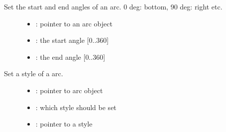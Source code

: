 \documentclass[letterpaper,10pt,english]{sphinxmanual}
\begin{document}
\begin{fulllineitems}
\label{\detokenize{object-types/arc:_CPPv417lv_arc_set_anglesP8lv_obj_t8uint16_t8uint16_t}}%
\pysigstartmultiline
{}\label{\detokenize{object-types/arc:lv__arc_8h_1adeefed29c45e9fc124ccad352a1e663a}}%
\pysigstopmultiline
Set the start and end angles of an arc. 0 deg: bottom, 90 deg: right etc. \begin{description}
\item[{}] \leavevmode\begin{itemize}
\item {} 
: pointer to an arc object 

\item {} 
: the start angle {[}0..360{]} 

\item {} 
: the end angle {[}0..360{]} 

\end{itemize}

\end{description}


\end{fulllineitems}


\begin{fulllineitems}
\label{\detokenize{object-types/arc:_CPPv416lv_arc_set_styleP8lv_obj_t14lv_arc_style_tPK10lv_style_t}}%
\pysigstartmultiline
{}\label{\detokenize{object-types/arc:lv__arc_8h_1af7148d3fea5bc35d300d838a9402dc50}}%
\pysigstopmultiline
Set a style of a arc. \begin{description}
\item[{}] \leavevmode\begin{itemize}
\item {} 
: pointer to arc object 

\item {} 
: which style should be set 

\item {} 
: pointer to a style 

\end{itemize}

\end{description}


\end{fulllineitems}
\end{document}
